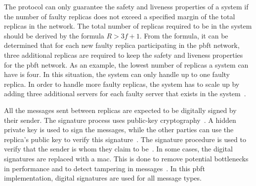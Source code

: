 The protocol can only guarantee the safety and liveness properties of a system if the number of faulty replicas does not exceed a specified margin of the total replicas in the network. The total number of replicas required to be in the system should be derived by the formula $R > 3f + 1$. From the formula, it can be determined that for each new faulty replica participating in the \ac{pbft} network, three additional replicas are required to keep the safety and liveness properties for the \ac{pbft} network.
As an example, the lowest number of replicas a system can have is four. In this situation, the system can only handle up to one faulty replica. In order to handle more faulty replicas, the system has to scale up by adding three additional servers for each faulty server that exists in the system~\cites{SLIDES:PBFT}[p.~257]{BOOK:BuildDepDistSyst}[p.~403]{PAPER:PBFTRecovery}[p.~3]{PAPER:OGPBFT}.

All the messages sent between replicas are expected to be digitally signed by their sender. The signature process uses public-key cryptography~\cite[p.~257,p.267]{BOOK:BuildDepDistSyst}. A hidden private key is used to sign the messages, while the other parties can use the replica’s public key to verify this signature~\cite[p.~417]{PAPER:PBFTRecovery}. The signature procedure is used to verify that the sender is whom they claim to be~\cite[p.~3]{PAPER:OGPBFT}. In some cases, the digital signatures are replaced with a \ac{mac}. This is done to remove potential bottlenecks in performance and to detect tampering in messages~\cites[p.~257]{BOOK:BuildDepDistSyst}[p.~3,8]{PAPER:OGPBFT}. In this \ac{pbft} implementation, digital signatures are used for all message types.

